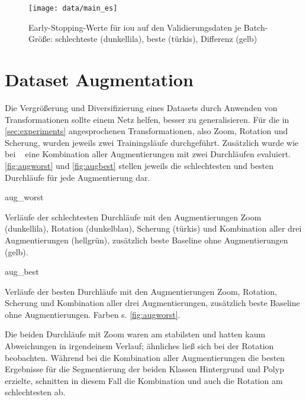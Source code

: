 \begin{figure}
	\centering
	\texttt{[image: data/main\_es]}
	\caption[Early-Stopping-Werte für \gls{iou} auf den Validierungsdaten je Batch-Größe]{Early-Stopping-Werte für \gls{iou} auf den Validierungsdaten je Batch-Größe: schlechteste (dunkellila), beste (türkis), Differenz (gelb)}
	\label{fig:es081632}
\end{figure}



\section{Dataset Augmentation}

Die Vergrößerung und Diversifizierung eines Datasets durch Anwenden von Transformationen sollte einem Netz helfen, besser zu generalisieren.
Für die in \autoref{sec:experiments} angesprochenen Transformationen, also Zoom, Rotation und Scherung, wurden jeweils zwei Trainingsläufe durchgeführt.
Zusätzlich wurde wie bei ~\cite{Vazquez.2017} eine Kombination aller Augmentierungen mit zwei Durchläufen evaluiert.
\autoref{fig:augworst} und \autoref{fig:augbest} stellen jeweils die schlechtesten und besten Durchläufe für jede Augmentierung dar.

\begin{losses}{aug_worst}
	\caption[Verläufe der schlechtesten Durchläufe mit Augmentierungen]{Verläufe der schlechtesten Durchläufe mit den Augmentierungen Zoom (dunkellila), Rotation (dunkelblau), Scherung (türkis) und Kombination aller drei Augmentierungen (hellgrün), zusätzlich beste Baseline ohne Augmentierungen (gelb).}
	\label{fig:augworst}
\end{losses}

\begin{losses}{aug_best}
	\caption[Verläufe der besten Durchläufe mit Augmentierungen]{Verläufe der besten Durchläufe mit den Augmentierungen Zoom, Rotation, Scherung und Kombination aller drei Augmentierungen, zusätzlich beste Baseline ohne Augmentierungen. Farben s. \autoref{fig:augworst}.}
	\label{fig:augbest}
\end{losses}

Die beiden Durchläufe mit Zoom waren am stabilsten und hatten kaum Abweichungen in irgendeinem Verlauf; ähnliches ließ sich bei der Rotation beobachten.
Während bei \cite{Vazquez.2017} die Kombination aller Augmentierungen die besten Ergebnisse für die Segmentierung der beiden Klassen Hintergrund und Polyp erzielte, schnitten in diesem Fall die Kombination und auch die Rotation am schlechtesten ab.

